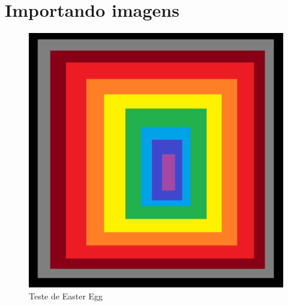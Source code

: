 \chapter{Importando imagens} %

\begin{figure}
  \centering
  \caption{Teste de Easter Egg}
  \includegraphics[scale=0.5]{files/img/Codificacao/teste}

  \legend{\selfAuthor}
\end{figure}

